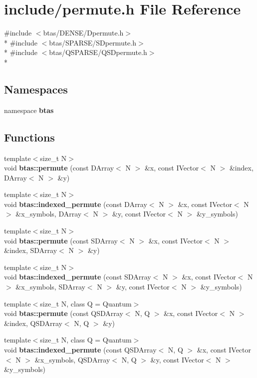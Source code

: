 \section{include/permute.h File Reference}
\label{df/da6/permute_8h}
{\ttfamily \#include $<$btas/\-D\-E\-N\-S\-E/\-Dpermute.\-h$>$}\\*
{\ttfamily \#include $<$btas/\-S\-P\-A\-R\-S\-E/\-S\-Dpermute.\-h$>$}\\*
{\ttfamily \#include $<$btas/\-Q\-S\-P\-A\-R\-S\-E/\-Q\-S\-Dpermute.\-h$>$}\\*
\subsection*{Namespaces}
\begin{DoxyCompactItemize}
\item 
namespace {\bf btas}
\end{DoxyCompactItemize}
\subsection*{Functions}
\begin{DoxyCompactItemize}
\item 
{\footnotesize template$<$size\-\_\-t N$>$ }\\void {\bf btas\-::permute} (const D\-Array$<$ N $>$ \&x, const I\-Vector$<$ N $>$ \&index, D\-Array$<$ N $>$ \&y)
\item 
{\footnotesize template$<$size\-\_\-t N$>$ }\\void {\bf btas\-::indexed\-\_\-permute} (const D\-Array$<$ N $>$ \&x, const I\-Vector$<$ N $>$ \&x\-\_\-symbols, D\-Array$<$ N $>$ \&y, const I\-Vector$<$ N $>$ \&y\-\_\-symbols)
\item 
{\footnotesize template$<$size\-\_\-t N$>$ }\\void {\bf btas\-::permute} (const S\-D\-Array$<$ N $>$ \&x, const I\-Vector$<$ N $>$ \&index, S\-D\-Array$<$ N $>$ \&y)
\item 
{\footnotesize template$<$size\-\_\-t N$>$ }\\void {\bf btas\-::indexed\-\_\-permute} (const S\-D\-Array$<$ N $>$ \&x, const I\-Vector$<$ N $>$ \&x\-\_\-symbols, S\-D\-Array$<$ N $>$ \&y, const I\-Vector$<$ N $>$ \&y\-\_\-symbols)
\item 
{\footnotesize template$<$size\-\_\-t N, class Q  = Quantum$>$ }\\void {\bf btas\-::permute} (const Q\-S\-D\-Array$<$ N, Q $>$ \&x, const I\-Vector$<$ N $>$ \&index, Q\-S\-D\-Array$<$ N, Q $>$ \&y)
\item 
{\footnotesize template$<$size\-\_\-t N, class Q  = Quantum$>$ }\\void {\bf btas\-::indexed\-\_\-permute} (const Q\-S\-D\-Array$<$ N, Q $>$ \&x, const I\-Vector$<$ N $>$ \&x\-\_\-symbols, Q\-S\-D\-Array$<$ N, Q $>$ \&y, const I\-Vector$<$ N $>$ \&y\-\_\-symbols)
\end{DoxyCompactItemize}

